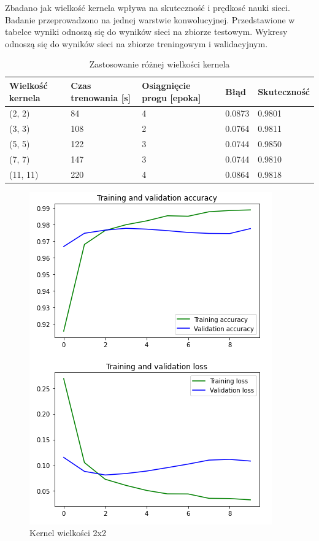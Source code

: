 \documentclass{article}
\begin{document}
Zbadano jak wielkość kernela wpływa na skuteczność i prędkosć nauki sieci. Badanie przeprowadzono na jednej warstwie konwolucyjnej.
Przedstawione w tabelce wyniki odnoszą się do wyników sieci na zbiorze testowym. Wykresy odnoszą się do wyników sieci na zbiorze treningowym i walidacyjnym.

\begin{table}[h]
  \centering
    
  \bgroup
  \def\arraystretch{1.3}
\begin{tabular}{|l|l|l|l|l|}
\hline
Wielkość kernela & Czas trenowania [s] & Osiągnięcie progu [epoka] & Błąd & Skuteczność \\ \hline
(2, 2) & 84 & 4 & 0.0873 & 0.9801 \\ \hline
(3, 3) & 108 & 2 & 0.0764 & 0.9811 \\ \hline
(5, 5) & 122 & 3 & 0.0744 & 0.9850 \\ \hline
(7, 7) & 147 & 3 & 0.0744 & 0.9810 \\ \hline
(11, 11) & 220 & 4 & 0.0864 & 0.9818 \\ \hline
\end{tabular}
  \egroup
  \vspace{10pt}
  \caption{Zastosowanie różnej wielkości kernela}
\end{table}

\begin{figure}[h]
  \centering
  \includegraphics[width=\linewidth]{kernel_2_2.png}
  \caption{Kernel wielkości 2x2}
\end{figure}
\end{document}

